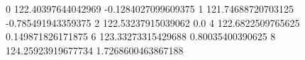 0 122.40397644042969 -0.1284027099609375
1 121.74688720703125 -0.785491943359375
2 122.53237915039062 0.0
4 122.6822509765625 0.149871826171875
6 123.33273315429688 0.80035400390625
8 124.25923919677734 1.7268600463867188

